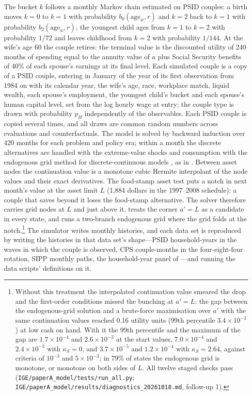The bucket $k$ follows a monthly Markov chain estimated on PSID couples: a birth moves $k = 0$ to $k = 1$ with
probability $b_0(\text{age}_w, r)$ and $k = 2$ back to $k = 1$ with probability $b_2(\text{age}_w, r)$; the youngest
child ages from $k = 1$ to $k = 2$ with probability $1/72$ and leaves childhood from $k = 2$ with probability $1/144$.
At the wife's age 60 the couple retires: the terminal value is the discounted utility of 240 months of spending equal
to the annuity value of $a$ plus Social Security benefits of 40\% of each spouse's earnings at its final level. Each
simulated couple is a copy of a PSID couple, entering in January of the year of its first observation from 1984 on with
its calendar year, the wife's age, race, workplace match, liquid wealth, each spouse's employment, the youngest
child's bucket and each spouse's human capital level, set from the log hourly wage at entry; the couple type is drawn
with probability $p_H$ independently of the observables. Each PSID couple is copied several times, and all draws are
common random numbers across evaluations and counterfactuals. The model is solved by backward induction over 420
months for each problem and policy era; within a month the discrete alternatives are handled with the extreme-value
shocks and consumption with the endogenous grid method for discrete-continuous models \citep{carroll2006method,
iskhakov2017endogenous}, as in \citet{bacher2025joint}. Between asset nodes the continuation value is a
monotone cubic Hermite interpolant of the node values and their exact derivatives. The food-stamp asset test puts a
notch in next month's value at the asset limit $L$ (1{,}884 dollars in the 1997--2008 schedule): a couple that saves
beyond it loses the food-stamp alternative. The solver therefore carries grid nodes at $L$ and just above it, treats
the corner $a' = L$ as a candidate in every state, and runs a two-branch endogenous grid where the grid folds at the
notch.\footnote{Without this treatment the interpolated continuation value smeared the drop and the first-order
conditions missed the bunching at $a' = L$: the gap between the endogenous-grid solution and a brute-force maximisation
over $a'$ with the same continuation values reached 0.16 utility units (99th percentile $3.4 \times 10^{-3}$) at low
cash on hand. With it the 99th percentile and the maximum of the gap are $1.7 \times 10^{-4}$ and $2.6 \times
10^{-3}$ at the start values, $7.0 \times 10^{-4}$ and $2.4 \times 10^{-3}$ with $\kappa_S = 0$, and $3.7 \times
10^{-5}$ and $1.2 \times 10^{-4}$ with $\kappa_S = 2.64$, against criteria of $10^{-3}$ and $5 \times 10^{-3}$; in 79\% of
states the endogenous grid is monotone, or monotone on both sides of $L$. All twelve staged checks pass (\texttt{IGE/paperA\_model/tests/run\_all.py};
\texttt{IGE/paperA\_model/results/diagnostics\_20261018.md}, follow-up 1).} The simulator writes monthly histories, and each data set is
reproduced by writing the histories in that data set's shape---PSID household-years in the waves in which the couple is
observed, CPS couple-months in the four-eight-four rotation, SIPP monthly paths, the household-year panel of
\citet{blundell2016consumption}---and running the data scripts' definitions on it.

